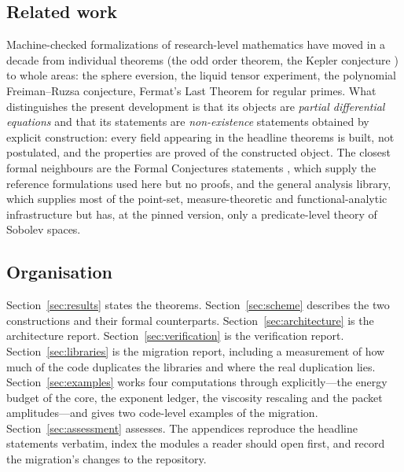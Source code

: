 \subsection{Related work}

Machine-checked formalizations of research-level mathematics have moved in a decade from
individual theorems (the odd order theorem, the Kepler conjecture \cite{flyspeck}) to
whole areas: the sphere eversion, the liquid tensor experiment, the polynomial Freiman--Ruzsa
conjecture, Fermat's Last Theorem for regular primes. What distinguishes the present
development is that its objects are \emph{partial differential equations} and that its
statements are \emph{non-existence} statements obtained by explicit construction: every
field appearing in the headline theorems is built, not postulated, and the properties are
proved of the constructed object. The closest formal neighbours are the Formal Conjectures
statements \cite{formalconj}, which supply the reference formulations used here but no
proofs, and the general \Mathlib{} analysis library, which supplies most of the
point-set, measure-theoretic and functional-analytic infrastructure but has, at the pinned
version, only a predicate-level theory of Sobolev spaces.

\subsection{Organisation}

Section~\ref{sec:results} states the theorems. Section~\ref{sec:scheme} describes the two
constructions and their formal counterparts. Section~\ref{sec:architecture} is the
architecture report. Section~\ref{sec:verification} is the verification report.
Section~\ref{sec:libraries} is the migration report, including a measurement of how much
of the code duplicates the libraries and where the real duplication lies.
Section~\ref{sec:examples} works four computations through explicitly---the energy budget of
the core, the exponent ledger, the viscosity rescaling and the packet amplitudes---and gives
two code-level examples of the migration. Section~\ref{sec:assessment} assesses.
The appendices reproduce the headline statements verbatim, index the modules a reader
should open first, and record the migration's changes to the repository.
